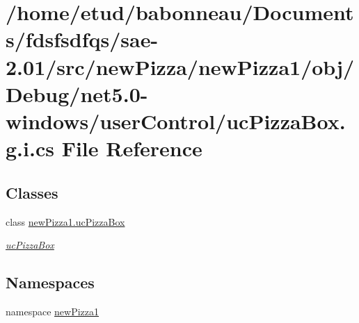 \hypertarget{net5_80-windows_2userControl_2ucPizzaBox_8g_8i_8cs}{}\section{/home/etud/babonneau/\+Documents/fdsfsdfqs/sae-\/2.01/src/new\+Pizza/new\+Pizza1/obj/\+Debug/net5.0-\/windows/user\+Control/uc\+Pizza\+Box.g.\+i.\+cs File Reference}
\label{net5_80-windows_2userControl_2ucPizzaBox_8g_8i_8cs}
\subsection*{Classes}
\begin{DoxyCompactItemize}
\item 
class \hyperlink{classnewPizza1_1_1ucPizzaBox}{new\+Pizza1.\+uc\+Pizza\+Box}
\begin{DoxyCompactList}\small\item\em \hyperlink{classnewPizza1_1_1ucPizzaBox}{uc\+Pizza\+Box} \end{DoxyCompactList}\end{DoxyCompactItemize}
\subsection*{Namespaces}
\begin{DoxyCompactItemize}
\item 
namespace \hyperlink{namespacenewPizza1}{new\+Pizza1}
\end{DoxyCompactItemize}
